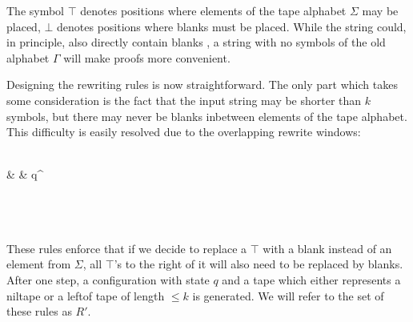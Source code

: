 \documentclass[a4paper,UKenglish,cleveref, autoref]{lipics-v2019}
\begin{document}
The symbol $\top$ denotes positions where elements of the tape alphabet $\Sigma$ may be placed, $\bot$ denotes positions where blanks must be placed. While the string could, in principle, also directly contain blanks \blank{}, a string with no symbols of the old alphabet $\Gamma$ will make proofs more convenient. 

Designing the rewriting rules is now straightforward. The only part which takes some consideration is the fact that the input string may be shorter than $k$ symbols, but there may never be blanks inbetween elements of the tape alphabet. This difficulty is easily resolved due to the overlapping rewrite windows:
\begin{center}
  \rewwin{\bot & \bot & \bot}{\blank & \blank & \blank}
  \rewwin{\underline{\#} & \bot & \bot}{\# & \blank & \blank}
  \rewwin{\bot & \bot & \underline{\#}}{\blank & \blank & \#} \\[3ex]
   {\blank & \blank & q^\blank}
   \\[3ex]
   \\[3ex]
  \rewwin{\top & \top & \top}{\blank & \blank & \blank} \\[3ex]
  \rewwin{\top & \top & \bot}{\blank & \blank & \blank} 
  \rewwin{\top & \bot & \bot}{\blank & \blank & \blank} \\[3ex]
\end{center}

These rules enforce that if we decide to replace a $\top$ with a blank instead of an element from $\Sigma$, all $\top$'s to the right of it will also need to be replaced by blanks. After one step, a configuration with state $q$ and a tape which either represents a \textsf{niltape} or a \textsf{leftof} tape of length $\le k$ is generated. 
We will refer to the set of these rules as $R'$.
\end{document}
